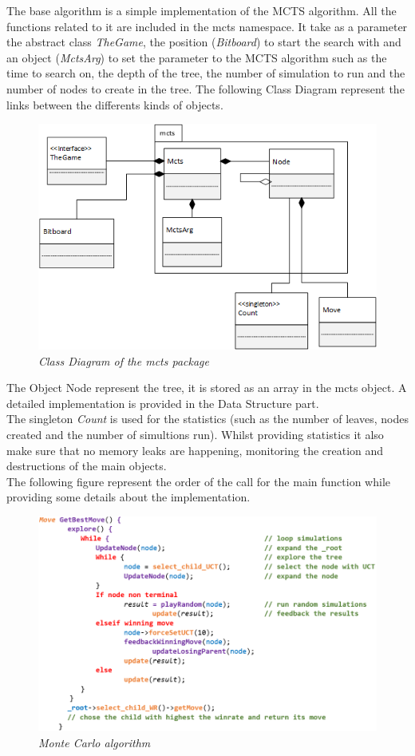 The base algorithm is a simple implementation of the MCTS algorithm. All the functions related to it are included in the mcts namespace.
It take as a parameter the abstract class \textit{TheGame}, the position (\textit{Bitboard}) to start the search with and an object (\textit{MctsArg}) to set the parameter to the MCTS algorithm such as the time to search on, the depth of the tree, the number of simulation to run and the number of nodes to create in the tree.
The following Class Diagram represent the links between the differents kinds of objects.
\begin{figure}[H] 
\centerline{\includegraphics[scale=1]{Base_Algorithm/Img/MCTSsimple.png}}
\caption{\label{fig:MCTSClassDiagram}\textit{Class Diagram of the mcts package}}
\end{figure}
The Object Node represent the tree, it is stored as an array in the mcts object. A detailed implementation is provided in the Data Structure part.\\
The singleton \textit{Count} is used for the statistics (such as the number of leaves, nodes created and the number of simultions run). Whilst providing statistics it also make sure that no  memory leaks are happening, monitoring the creation and destructions of the main objects.\\ 
The following figure represent the order of the call for the main function while providing some details about the implementation.
\begin{figure}[H]
\centerline{\includegraphics[scale=0.70]{Base_Algorithm/Img/Algorithm.png}}
\caption{\label{fig:MCTSAlgorithm}\textit{Monte Carlo algorithm}}
\end{figure}
